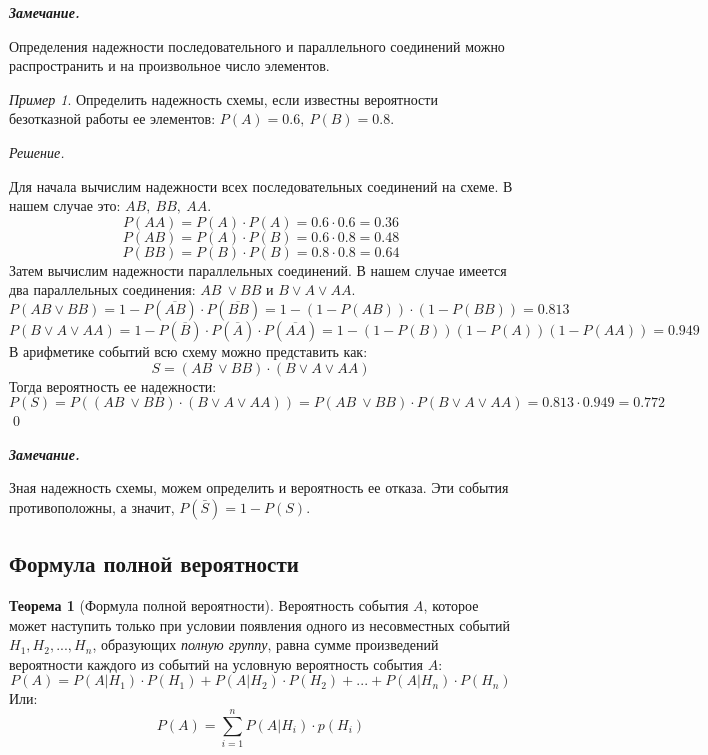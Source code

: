 \documentclass[12pt,a4paper]{article}
\theoremstyle{definition}
\theoremstyle{definition}
\newtheorem{theorem}{Теорема}[section]
\theoremstyle{remark}
\newenvironment{remark}{
  \par\noindent\textbf{\textit{Замечание.}}~
}{\par}
\theoremstyle{corollary}
\theoremstyle{bolditalic}
\newtheorem{example}{Пример}[section]
\newenvironment{solution}{
    \vspace{0.5em}
    \noindent\textit{Решение.}
}{\qed\vspace{1em}}
\begin{document}

\begin{remark}
    Определения надежности последовательного и параллельного соединений можно распространить и на произвольное число элементов.
\end{remark}

\begin{example}
    Определить надежность схемы, если известны вероятности безотказной работы ее элементов: $P(A)=0.6,\ P(B)=0.8$.
\end{example}


\begin{solution}
    Для начала вычислим надежности всех последовательных соединений на схеме. В нашем случае это: $AB,\ BB,\ AA$.
    \[
    P(AA)=P(A)\cdot P(A)=0.6\cdot0.6=0.36
\]\[
    P(AB)=P(A)\cdot P(B)=0.6\cdot 0.8 = 0.48
    \]
    \[
    P(BB)=P(B)\cdot P(B)=0.8\cdot 0.8 = 0.64
    \]
    Затем вычислим надежности параллельных соединений. В нашем случае имеется два параллельных соединения: $AB\ \lor BB$ и $B\lor A \lor AA$.
    \[
    P(AB \lor BB) = 1 - P(\overline{AB})\cdot P(\overline{BB})=1-(1-P(AB))\cdot (1-P(BB))=0.813
    \]
    \[
    P(B\lor A \lor AA)=1-P(\overline{B})\cdot P(\overline{A}) \cdot P(\overline{AA})= 1-(1-P(B))(1-P(A))(1-P(AA))=0.949
    \]
    В арифметике событий всю схему можно представить как:
    \[
    S = (AB\ \lor BB)\cdot(B\lor A \lor AA)
    \]
    Тогда вероятность ее надежности:
    \[
    P(S)=P((AB\ \lor BB)\cdot(B\lor A \lor AA))=P(AB\ \lor BB)\cdot P(B\lor A \lor AA)=0.813\cdot0.949=0.772
    \]
\end{solution}

\begin{remark}
    Зная надежность схемы, можем определить и вероятность ее отказа. Эти события противоположны, а значит, $P(\bar{S})=1-P(S)$.
\end{remark}

\subsection{Формула полной вероятности}

\begin{theorem}[Формула полной вероятности]
    Вероятность события $A$, которое может наступить только при условии появления одного из несовместных событий $H_1, H_2, ..., H_n$, образующих \textit{полную группу}, равна сумме произведений вероятности каждого из событий на условную вероятность события $A$:
    \[
    P(A) = P(A|H_1)\cdot P(H_1)+P(A|H_2)\cdot P(H_2)+...+P(A|H_n)\cdot P(H_n)
    \]
    Или:
    \[
    P(A)=\sum_{i=1}^{n}{P(A|H_i)\cdot p(H_i)}
    \]
\end{theorem}
\end{document}
